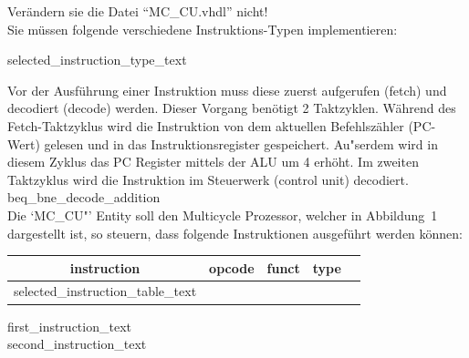 \documentclass[a4paper,12pt]{article}
\newcommand\Tstrut{\rule{0pt}{2.6ex}}       %
\begin{document}
\begin{center}
\end{center}

Ver\"andern sie die Datei "`MC\_CU.vhdl"' nicht!\\

Sie m\"ussen folgende verschiedene Instruktions-Typen implementieren:

{{selected_instruction_type_text}}


Vor der Ausf\"uhrung einer Instruktion muss diese zuerst aufgerufen (fetch) und decodiert (decode) werden. Dieser Vorgang ben\"otigt 2 Taktzyklen.  W\"ahrend des Fetch-Taktzyklus wird die Instruktion von dem aktuellen Befehlsz\"ahler (PC-Wert) gelesen und in das Instruktionsregister gespeichert. Au"serdem wird in diesem Zyklus das PC Register mittels der ALU um 4 erh\"oht. Im zweiten Taktzyklus wird die Instruktion im Steuerwerk (control unit) decodiert. {{beq_bne_decode_addition}} \\

Die `MC\_CU"' Entity soll den Multicycle Prozessor, welcher in Abbildung~1 dargestellt ist, so steuern, dass folgende Instruktionen ausgef\"uhrt werden k\"onnen:

\begin{table}[h!]
\centering
    \begin{tabular}{|c|c|c|c|c|} \hline \Tstrut
		instruction & opcode  & funct & type   \\ \hline \Tstrut
		{{selected_instruction_table_text}}
    \hline
    \end{tabular}
\end{table}

{{first_instruction_text}} \\

{{second_instruction_text}} \\
\end{document}
